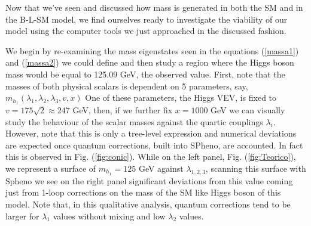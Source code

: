 \documentclass[12pt]{article}
\begin{document}
Now that we've seen and discussed how mass is generated in both the SM and in the B-L-SM model, we find ourselves ready to investigate the viability of our model using the computer tools we just approached in the discussed fashion. 

We begin by re-examining the mass eigenstates seen in the equations (\ref{massa1}) and (\ref{massa2}) we could define and then study a region where the Higgs boson mass would be equal to 125.09 GeV, the observed value. 
%
First, note that the masses of both physical scalars is dependent on 5 parameters, say, $m_{h_1}(\lambda_1,\lambda_2,\lambda_3,v,x)$  One of these parameters, the Higgs VEV, is fixed to $v=175 \sqrt{2} \approx 247$ GeV, then, if we further fix $x = 1000$ GeV we can visually study the behaviour of the scalar masses against the quartic couplings $\lambda_i$.
%
% 
%
However, note that this is only a tree-level expression and numerical deviations are expected once quantum corrections, built into SPheno, are accounted. In fact this is observed in Fig. (\ref{fig:conic}). While on the left panel, Fig.  (\ref{fig:Teorico}), we represent a surface of $m_{h_1} = 125$ GeV against $\lambda_{1,2,3}$, scanning this surface with Spheno we see on the right panel significant deviations from this value coming just from 1-loop corrections on the mass of the SM like Higgs boson of this model. Note that, in this qualitative analysis, quantum corrections tend to be larger for $\lambda_1$ values without mixing and low  $\lambda_2$ values.
%
\end{document}
